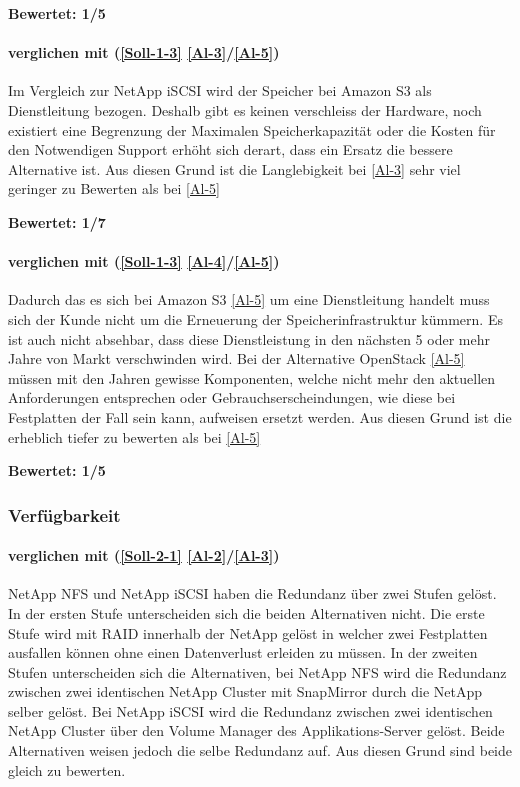 \textbf{Bewertet: 1/5}

\paragraph*{  verglichen mit  (\ref{Soll-1-3} \ref{Al-3}/\ref{Al-5})}
Im Vergleich zur NetApp iSCSI wird der Speicher bei Amazon S3 als Dienstleitung bezogen. Deshalb gibt es keinen verschleiss der Hardware, noch existiert eine Begrenzung der Maximalen Speicherkapazität oder die Kosten für den Notwendigen Support erhöht sich derart, dass ein Ersatz die bessere Alternative ist.
Aus diesen Grund ist die Langlebigkeit bei  \ref{Al-3} sehr viel geringer zu Bewerten als bei  \ref{Al-5}

\textbf{Bewertet: 1/7}


\paragraph*{  verglichen mit  (\ref{Soll-1-3} \ref{Al-4}/\ref{Al-5})}
Dadurch das es sich bei Amazon S3 \ref{Al-5} um eine Dienstleitung handelt muss sich der Kunde nicht um die Erneuerung der Speicherinfrastruktur kümmern. Es ist auch nicht absehbar, dass diese Dienstleistung in den nächsten 5 oder mehr Jahre von Markt verschwinden wird. Bei der Alternative OpenStack \ref{Al-5} müssen mit den Jahren gewisse Komponenten, welche nicht mehr den aktuellen Anforderungen entsprechen oder Gebrauchserscheindungen, wie diese bei Festplatten der Fall sein kann, aufweisen ersetzt werden. Aus diesen Grund ist die  erheblich tiefer zu bewerten als bei \ref{Al-5}

\textbf{Bewertet: 1/5}


\subsubsection{Verfügbarkeit}

\paragraph*{  verglichen mit  (\ref{Soll-2-1} \ref{Al-2}/\ref{Al-3})}
NetApp NFS und NetApp iSCSI haben die Redundanz über zwei Stufen gelöst. In der ersten Stufe unterscheiden sich die beiden Alternativen nicht. Die erste Stufe wird mit RAID innerhalb der NetApp gelöst in welcher zwei Festplatten ausfallen können ohne einen Datenverlust erleiden zu müssen. In der zweiten Stufen unterscheiden sich die Alternativen, bei NetApp NFS wird die Redundanz zwischen zwei identischen NetApp Cluster mit SnapMirror durch die NetApp selber gelöst. Bei NetApp iSCSI wird die Redundanz zwischen zwei identischen NetApp Cluster über den Volume Manager des Applikations-Server gelöst. Beide Alternativen weisen jedoch die selbe Redundanz auf. Aus diesen Grund sind beide gleich zu bewerten.

